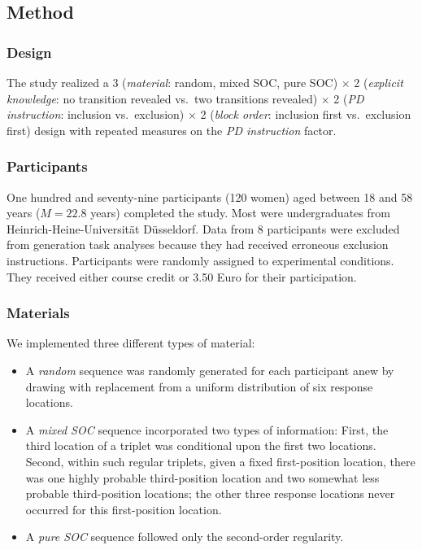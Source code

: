 \documentclass[english,,man]{apa6}
\providecommand{\tightlist}{%
  \setlength{\itemsep}{0pt}\setlength{\parskip}{0pt}}
\begin{document}
\hypertarget{method-2}{%
\subsection{Method}\label{method-2}}

\hypertarget{design-2}{%
\subsubsection{Design}\label{design-2}}

The study realized a 3 (\emph{material}: random, mixed SOC, pure SOC) \(\times\) 2 (\emph{explicit knowledge}: no transition revealed vs.~two transitions revealed) \(\times\) 2 (\emph{PD instruction}: inclusion vs.~exclusion) \(\times\) 2 (\emph{block order}: inclusion first vs.~exclusion first) design with repeated measures on the \emph{PD instruction} factor.

\hypertarget{participants-2}{%
\subsubsection{Participants}\label{participants-2}}

One hundred and seventy-nine participants (120 women) aged between 18 and 58 years (\(M = 22.8\) years) completed the study.
Most were undergraduates from Heinrich-Heine-Universität Düsseldorf.
Data from 8 participants were excluded from generation task analyses because they had received erroneous exclusion instructions.
Participants were randomly assigned to experimental conditions.
They received either course credit or 3.50 Euro for their participation.

\hypertarget{materials-2}{%
\subsubsection{Materials}\label{materials-2}}

We implemented three different types of material:

\begin{itemize}
\tightlist
\item
  A \emph{random} sequence was randomly generated for each participant anew by drawing with replacement from a uniform distribution of six response locations.
\item
  A \emph{mixed SOC} sequence incorporated two types of information:
  First, the third location of a triplet was conditional upon the first two locations.
  Second, within such regular triplets, given a fixed first-position location, there was one highly probable third-position location and two somewhat less probable third-position locations; the other three response locations never occurred for this first-position location.
\item
  A \emph{pure SOC} sequence followed only the second-order regularity.
\end{itemize}
\end{document}
